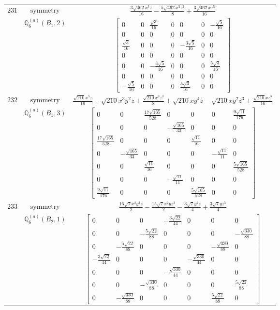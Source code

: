 \documentclass[fleqn,8pt,landscape]{jsarticle}
\begin{document}
\begin{longtable}{ccc}
$ 231 $ & $ \text{symmetry} $ & $ \frac{3 \sqrt{462} x^{5} z}{16} - \frac{5 \sqrt{462} x^{3} z^{3}}{8} + \frac{3 \sqrt{462} x z^{5}}{16} $ \\
$  $ & $ \mathbb{Q}_{6}^{(a)}(B_{1},2) $ & $ \begin{bmatrix} 0 & 0 & \frac{\sqrt{3}}{16} & 0 & 0 & 0 & - \frac{\sqrt{5}}{16} \\ 0 & 0 & 0 & 0 & 0 & 0 & 0 \\ \frac{\sqrt{3}}{16} & 0 & 0 & 0 & - \frac{3 \sqrt{5}}{16} & 0 & 0 \\ 0 & 0 & 0 & 0 & 0 & 0 & 0 \\ 0 & 0 & - \frac{3 \sqrt{5}}{16} & 0 & 0 & 0 & \frac{5 \sqrt{3}}{16} \\ 0 & 0 & 0 & 0 & 0 & 0 & 0 \\ - \frac{\sqrt{5}}{16} & 0 & 0 & 0 & \frac{5 \sqrt{3}}{16} & 0 & 0 \end{bmatrix} $ \\ \hline
$ 232 $ & $ \text{symmetry} $ & $ \frac{\sqrt{210} x^{5} z}{16} - \sqrt{210} x^{3} y^{2} z + \frac{\sqrt{210} x^{3} z^{3}}{8} + \sqrt{210} x y^{4} z - \sqrt{210} x y^{2} z^{3} + \frac{\sqrt{210} x z^{5}}{16} $ \\
$  $ & $ \mathbb{Q}_{6}^{(a)}(B_{1},3) $ & $ \begin{bmatrix} 0 & 0 & \frac{17 \sqrt{165}}{528} & 0 & 0 & 0 & \frac{9 \sqrt{11}}{176} \\ 0 & 0 & 0 & - \frac{\sqrt{165}}{33} & 0 & 0 & 0 \\ \frac{17 \sqrt{165}}{528} & 0 & 0 & 0 & \frac{\sqrt{11}}{16} & 0 & 0 \\ 0 & - \frac{\sqrt{165}}{33} & 0 & 0 & 0 & - \frac{\sqrt{11}}{11} & 0 \\ 0 & 0 & \frac{\sqrt{11}}{16} & 0 & 0 & 0 & \frac{5 \sqrt{165}}{528} \\ 0 & 0 & 0 & - \frac{\sqrt{11}}{11} & 0 & 0 & 0 \\ \frac{9 \sqrt{11}}{176} & 0 & 0 & 0 & \frac{5 \sqrt{165}}{528} & 0 & 0 \end{bmatrix} $ \\ \hline
$ 233 $ & $ \text{symmetry} $ & $ \frac{15 \sqrt{7} x^{2} y^{3} z}{2} - \frac{15 \sqrt{7} x^{2} y z^{3}}{2} - \frac{3 \sqrt{7} y^{5} z}{4} + \frac{3 \sqrt{7} y z^{5}}{4} $ \\
$  $ & $ \mathbb{Q}_{6}^{(a)}(B_{2},1) $ & $ \begin{bmatrix} 0 & 0 & 0 & - \frac{3 \sqrt{22}}{44} & 0 & 0 & 0 \\ 0 & 0 & - \frac{5 \sqrt{22}}{88} & 0 & 0 & 0 & - \frac{\sqrt{330}}{88} \\ 0 & - \frac{5 \sqrt{22}}{88} & 0 & 0 & 0 & - \frac{\sqrt{330}}{88} & 0 \\ - \frac{3 \sqrt{22}}{44} & 0 & 0 & 0 & - \frac{\sqrt{330}}{44} & 0 & 0 \\ 0 & 0 & 0 & - \frac{\sqrt{330}}{44} & 0 & 0 & 0 \\ 0 & 0 & - \frac{\sqrt{330}}{88} & 0 & 0 & 0 & \frac{5 \sqrt{22}}{88} \\ 0 & - \frac{\sqrt{330}}{88} & 0 & 0 & 0 & \frac{5 \sqrt{22}}{88} & 0 \end{bmatrix} $ \\ \hline

\end{longtable}
\end{document}
